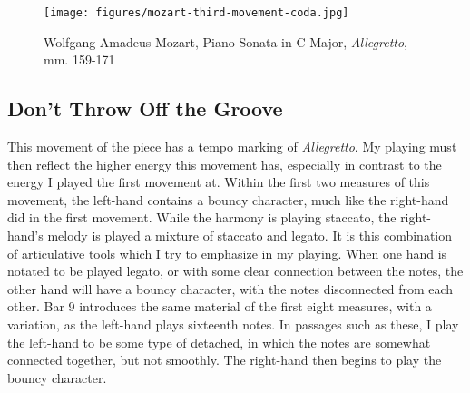 \begin{figure}
    \centering
    \texttt{[image: figures/mozart-third-movement-coda.jpg]}
    \caption{Wolfgang Amadeus Mozart, Piano Sonata in C Major, \textit{Allegretto}, mm. 159-171}
    \label{fig:mozart-third-movement-coda}
\end{figure}

\subsection{Don't Throw Off the Groove}

This movement of the piece has a tempo marking of \textit{Allegretto}. My playing must then reflect the higher energy this movement has, especially in contrast to the energy I played the first movement at. Within the first two measures of this movement, the left-hand contains a bouncy character, much like the right-hand did in the first movement. While the harmony is playing staccato, the right-hand's melody is played a mixture of staccato and legato. It is this combination of articulative tools which I try to emphasize in my playing. When one hand is notated to be played legato, or with some clear connection between the notes, the other hand will have a bouncy character, with the notes disconnected from each other. Bar 9 introduces the same material of the first eight measures, with a variation, as the left-hand plays sixteenth notes. In passages such as these, I play the left-hand to be some type of detached, in which the notes are somewhat connected together, but not smoothly. The right-hand then begins to play the bouncy character.